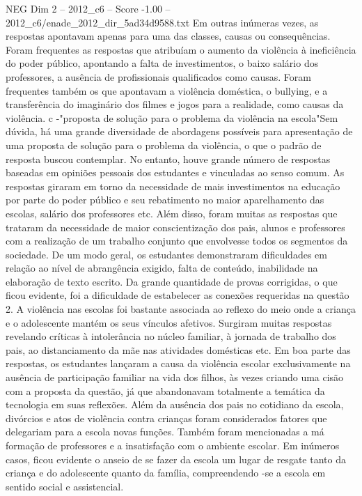 \begin{textsample}{NEG Dim 2 – 2012\_c6 – Score -1.00 – 2012\_c6/enade\_2012\_dir\_5ad34d9588.txt}
Em outras inúmeras vezes, as respostas apontavam apenas para uma das classes, causas ou consequências.
Foram frequentes as respostas que atribuíam o aumento da violência à ineficiência do poder público, apontando a falta de investimentos, o baixo salário dos professores, a ausência de profissionais qualificados como causas.
Foram frequentes também os que apontavam a violência doméstica, o bullying, e a transferência do imaginário dos filmes e jogos para a realidade, como causas da violência. c -"proposta de solução para o problema da violência na escola"Sem dúvida, há uma grande diversidade de abordagens possíveis para apresentação de uma proposta de solução para o problema da violência, o que o padrão de resposta buscou contemplar.
No entanto, houve grande número de respostas baseadas em opiniões pessoais dos estudantes e vinculadas ao senso comum.
As respostas giraram em torno da necessidade de mais investimentos na educação por parte do poder público e seu rebatimento no maior aparelhamento das escolas, salário dos professores etc.
Além disso, foram muitas as respostas que trataram da necessidade de maior conscientização dos pais, alunos e professores com a realização de um trabalho conjunto que envolvesse todos os segmentos da sociedade.
De um modo geral, os estudantes demonstraram dificuldades em relação ao nível de abrangência exigido, falta de conteúdo, inabilidade na elaboração de texto escrito.
Da grande quantidade de provas corrigidas, o que ficou evidente, foi a dificuldade de estabelecer as conexões requeridas na questão 2.
A violência nas escolas foi bastante associada ao reflexo do meio onde a criança e o adolescente mantém os seus vínculos afetivos.
Surgiram muitas respostas revelando críticas à intolerância no núcleo familiar, à jornada de trabalho dos pais, ao distanciamento da mãe nas atividades domésticas etc.
Em boa parte das respostas, os estudantes lançaram a causa da violência escolar exclusivamente na ausência de participação familiar na vida dos filhos, às vezes criando uma cisão com a proposta da questão, já que abandonavam totalmente a temática da tecnologia em suas reflexões.
Além da ausência dos pais no cotidiano da escola, divórcios e atos de violência contra crianças foram considerados fatores que delegariam para a escola novas funções.
Também foram mencionadas a má formação de professores e a insatisfação com o ambiente escolar.
Em inúmeros casos, ficou evidente o anseio de se fazer da escola um lugar de resgate tanto da criança e do adolescente quanto da família, compreendendo -se a escola em sentido social e assistencial.

\end{textsample}
